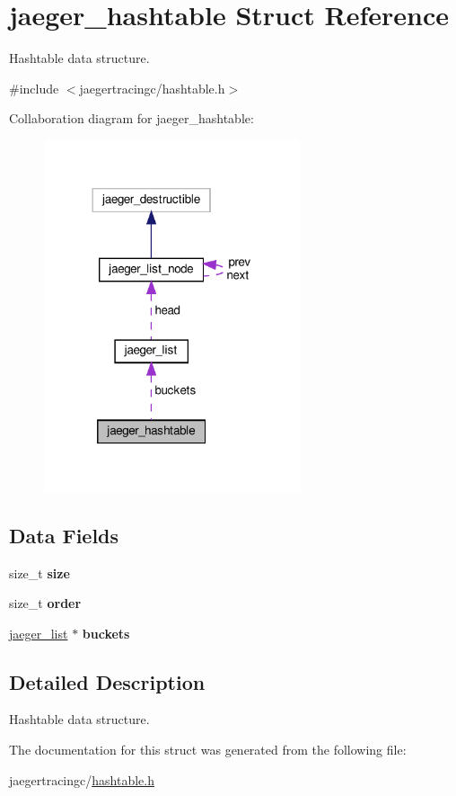 \hypertarget{structjaeger__hashtable}{}\section{jaeger\+\_\+hashtable Struct Reference}
\label{structjaeger__hashtable}


Hashtable data structure.  




{\ttfamily \#include $<$jaegertracingc/hashtable.\+h$>$}



Collaboration diagram for jaeger\+\_\+hashtable\+:\nopagebreak
\begin{figure}[H]
\begin{center}
\leavevmode
\includegraphics[width=213pt]{structjaeger__hashtable__coll__graph}
\end{center}
\end{figure}
\subsection*{Data Fields}
\begin{DoxyCompactItemize}
\item 
\mbox{\label{structjaeger__hashtable_a7afd4995727f79226cfb90d75b3db555}} 
size\+\_\+t {\bfseries size}
\item 
\mbox{\label{structjaeger__hashtable_a6c640cb2545575f3dc97ccecad8fa2e2}} 
size\+\_\+t {\bfseries order}
\item 
\mbox{\label{structjaeger__hashtable_af283e63203deff3a9793c3817244e59c}} 
\mbox{\hyperlink{structjaeger__list}{jaeger\+\_\+list}} $\ast$ {\bfseries buckets}
\end{DoxyCompactItemize}


\subsection{Detailed Description}
Hashtable data structure. 

The documentation for this struct was generated from the following file\+:\begin{DoxyCompactItemize}
\item 
jaegertracingc/\mbox{\hyperlink{hashtable_8h}{hashtable.\+h}}\end{DoxyCompactItemize}

